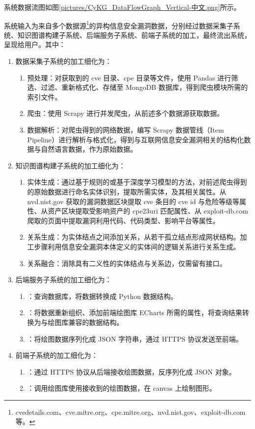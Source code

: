 \documentclass[a4paper,AutoFakeBold,oneside,12pt]{book}
\begin{document}
系统数据流图如图\ref{pictures/CyKG_DataFlowGraph_Vertical-中文.png}所示。


系统输入为来自多个数据源\footnote{cvedetails.com、cve.mitre.org、cpe.mitre.org、nvd.nist.gov、exploit-db.com 等。}的异构信息安全漏洞数据，分别经过数据采集子系统、知识图谱构建子系统、后端服务子系统、前端子系统的加工，最终流出系统，呈现给用户。其中：

\begin{enumerate}
	\item 数据采集子系统的加工细化为：
	      \begin{enumerate}
		      \item 预处理：对获取到的 cve 目录、cpe 目录等文件，使用 Pandas 进行筛选、过滤、重新格式化、存储至 MongoDB 数据库，得到爬虫模块所需的索引文件。
		      \item 爬虫：使用 Scrapy 进行并发爬虫，从前述多个数据源获取数据。
		      \item 数据解析：对爬虫得到的网络数据，编写 Scrapy 数据管线（Item Pipeline）进行解析与格式化，得到与互联网信息安全漏洞相关的结构化数据与自然语言数据，作为原始数据。
	      \end{enumerate}
	\item 知识图谱构建子系统的加工细化为：
	      \begin{enumerate}
		      \item 实体生成：通过基于规则的或基于深度学习模型的方法，对前述爬虫得到的原始数据进行命名实体识别，提取所需实体，及其相关属性。从 nvd.nist.gov 获取的漏洞数据区块提取 cve 条目的 cve id 与危险等级等属性、从资产区块提取受影响资产的 cpe23uri 匹配属性、从 exploit-db.com 爬取的页面中提取漏洞利用代码、代码类型、影响平台等属性。
		      \item 关系生成：为实体结点之间添加关系，从若干孤立结点形成网状结构。加工步骤利用信息安全漏洞本体定义的实体间的逻辑关系进行关系生成。
		      \item 关系融合：消除具有二义性的实体结点与关系边，仅需留有接口。
	      \end{enumerate}
	\item 后端服务子系统的加工细化为：
	      \begin{enumerate}
		      \item ：查询数据库，将数据转换成 Python 数据结构。
		      \item ：将数据重新组织、添加前端绘图库 ECharts 所需的属性，将查询结果转换为与绘图库兼容的数据结构。
		      \item ：将绘图数据序列化成 JSON 字符串，通过 HTTPS 协议发送至前端。
	      \end{enumerate}
	\item 前端子系统的加工细化为：
	      \begin{enumerate}
		      \item ：通过 HTTPS 协议从后端接收绘图数据，反序列化成 JSON 对象。
		      \item ：调用绘图库使用接收到的绘图数据，在 canvas 上绘制图形。
	      \end{enumerate}
\end{enumerate}
\end{document}
